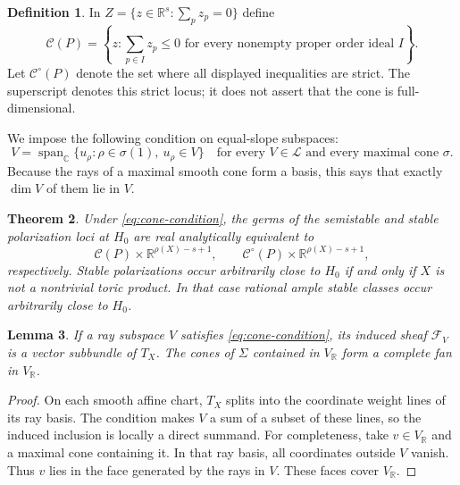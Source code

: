 \documentclass[11pt]{amsart}
\newtheorem{theorem}{Theorem}[section]
\newtheorem{lemma}[theorem]{Lemma}
\theoremstyle{definition}
\newtheorem{definition}[theorem]{Definition}
\theoremstyle{remark}
\newcommand{\RR}{\mathbb R}
\newcommand{\CC}{\mathbb C}
\newcommand{\Span}{\operatorname{span}}
\begin{document}
\begin{definition}
In $Z=\{z\in\RR^s:\sum_pz_p=0\}$ define
\[
 \mathcal C(P)=\left\{z:\sum_{p\in I}z_p\le0
       \text{ for every nonempty proper order ideal }I\right\}.
\]
Let $\mathcal C^\circ(P)$ denote the set where all displayed
inequalities are strict. The superscript denotes this strict locus;
it does not assert that the cone is full-dimensional.
\end{definition}

We impose the following condition on equal-slope subspaces:
\begin{equation}\label{eq:cone-condition}
 V=\Span_\CC\{u_\rho:\rho\in\sigma(1),\ u_\rho\in V\}
 \quad\text{for every }V\in\mathcal L
 \text{ and every maximal cone }\sigma.
\end{equation}
Because the rays of a maximal smooth cone form a basis, this says that
exactly $\dim V$ of them lie in $V$.

\begin{theorem}\label{thm:general}
Under \eqref{eq:cone-condition}, the germs of the semistable and stable
polarization loci at $H_0$ are real analytically equivalent to
\[
 \mathcal C(P)\times\RR^{\rho(X)-s+1},\qquad
 \mathcal C^\circ(P)\times\RR^{\rho(X)-s+1},
\]
respectively. Stable polarizations occur arbitrarily close to $H_0$
if and only if $X$ is not a nontrivial toric product. In that case
rational ample stable classes occur arbitrarily close to $H_0$.
\end{theorem}

\begin{lemma}\label{lem:positive-rays}
If a ray subspace $V$ satisfies \eqref{eq:cone-condition}, its induced
sheaf $\mathcal F_V$ is a vector subbundle of $T_X$. The cones of
$\Sigma$ contained in $V_\RR$ form a complete fan in $V_\RR$.
\end{lemma}
\begin{proof}
On each smooth affine chart, $T_X$ splits into the coordinate weight
lines of its ray basis. The condition makes $V$ a sum of a subset of
these lines, so the induced inclusion is locally a direct summand.
For completeness, take $v\in V_\RR$ and a maximal cone containing it.
In that ray basis, all coordinates outside $V$ vanish. Thus $v$ lies
in the face generated by the rays in $V$. These faces cover $V_\RR$.
\end{proof}
\end{document}
